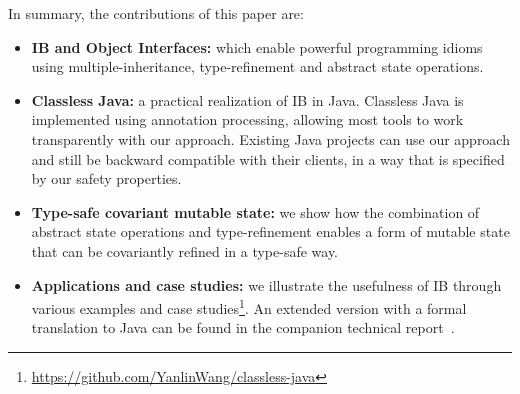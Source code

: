 In summary, the contributions of this paper are:
\begin{itemize}

\item {\bf IB and Object Interfaces:} which enable
  powerful programming idioms using multiple-inheritance,
  type-refinement and abstract state operations.

\item {\bf Classless Java:} a practical realization of IB in
  Java. Classless Java is implemented using annotation processing,
  allowing most tools to work transparently with our approach.
  Existing Java projects can use our approach and still be
  backward compatible with their clients, in a way that is specified
  by our safety properties.

\item {\bf Type-safe covariant mutable state:} we show how the
 combination of abstract state operations and type-refinement enables
 a form of mutable state that can be covariantly refined in a type-safe way.


\item {\bf Applications and case studies:} we illustrate the usefulness of IB
  through various examples and case studies\footnote{\url{https://github.com/YanlinWang/classless-java}}. 
  An extended version with a formal translation to Java can be found in the 
  companion technical report~\cite{classless}.


\end{itemize}
